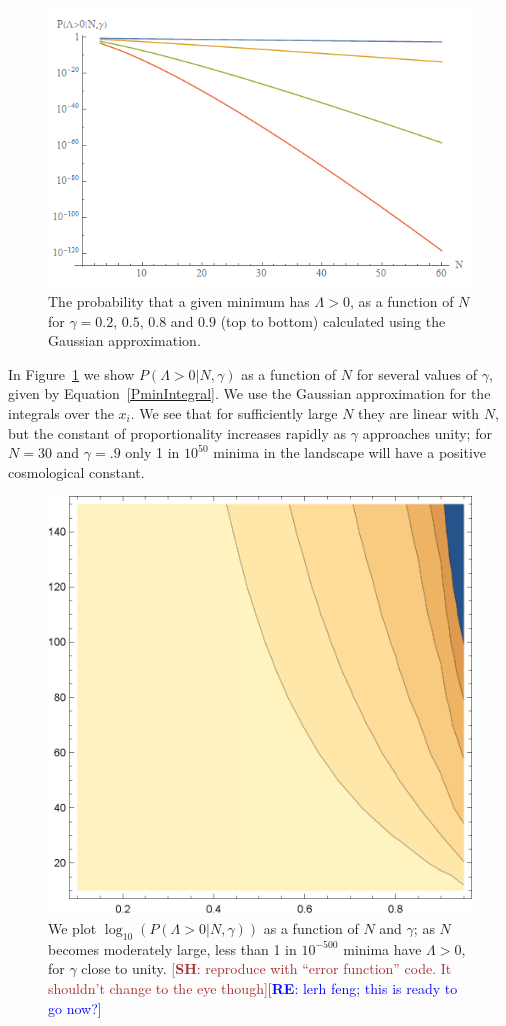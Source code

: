 \documentclass[12pt]{article}
\newcommand{\re}[1]{\textcolor{blue}{[{\bf RE}: #1]}}
\newcommand{\SH}[1]{\textcolor{brown}{[{\bf SH}: #1]}}
\begin{document}
\begin{figure} 
  \centering
  \includegraphics[width=.6 \linewidth]{pwithN.png}
  \caption{The probability that a given minimum has $\Lambda>0$, as a function of $N$ for $\gamma=0.2$, $0.5$, $0.8$ and $0.9$ (top to bottom) calculated using the Gaussian approximation.}
  \label{PVaryingWithNGaussian}
\end{figure}
  
In  Figure~\ref{PVaryingWithNGaussian} we show $P(\Lambda>0|N,\gamma)$ as a function of $N$ for several values of $\gamma$, given by Equation~\ref{PminIntegral}. We use the Gaussian approximation for the integrals over the $x_i$. We see that for sufficiently large $N$ they are linear with $N$, but the constant of proportionality increases rapidly as $\gamma$ approaches unity; for $N=30$ and $\gamma = .9$ only 1 in $10^{50}$ minima in the landscape will have a positive cosmological constant.


\begin{figure} 
  \centering
  \includegraphics[width=.6 \linewidth]{histo.eps}
  \caption{We plot $\log_{10}(P(\Lambda>0|N,\gamma))$ as a function of $N$ and $\gamma$; as $N$ becomes moderately large, less than 1 in $10^{-500}$ minima have $\Lambda>0$, for $\gamma$  close to unity.  \SH{reproduce with ``error function'' code. It shouldn't change to the eye though}\re{lerh feng; this is ready to go now?}}
  \label{fullcontourplot}
\end{figure}
\end{document}
